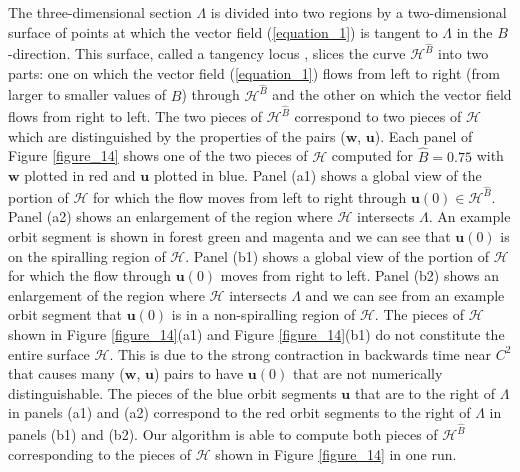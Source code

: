 \documentclass{ws-ijbc}
\begin{document}
The three-dimensional section $\Lambda$ is divided into two regions by a two-dimensional surface of points at which the vector field (\ref{equation_1}) is tangent to $\Lambda$ in the $B$-direction.  This surface, called a tangency locus \cite{tangency_locus_paper}, slices the curve $\mathscr{H}^{\widehat{B}}$ into two parts: one on which the vector field (\ref{equation_1}) flows from left to right (from larger to smaller values of $B$) through $\mathscr{H}^{\widehat{B}}$ and the other on which the vector field flows from right to left.  The two pieces of $\mathscr{H}^{\widehat{B}}$ correspond to two pieces of $\mathscr{H}$ which are distinguished by the properties of the pairs ($\mathbf{w}$, $\mathbf{u}$).  Each panel of Figure \ref{figure_14} shows one of the two pieces of $\mathscr{H}$ computed for $\widehat{B}=0.75$ with $\mathbf{w}$ plotted in red and $\mathbf{u}$ plotted in blue.  Panel (a1) shows a global view of the portion of $\mathscr{H}$ for which the flow moves from left to right through $\mathbf{u}(0) \in \mathscr{H}^{\widehat{B}}$.  Panel (a2) shows an enlargement of the region where $\mathscr{H}$ intersects $\Lambda$.  An example orbit segment is shown in forest green and magenta and we can see that $\mathbf{u}(0)$ is on the spiralling region of $\mathscr{H}$. Panel (b1) shows a global view of the portion of $\mathscr{H}$ for which the flow through $\mathbf{u}(0)$ moves from right to left.  Panel (b2) shows an enlargement of the region where $\mathscr{H}$ intersects $\Lambda$ and we can see from an example orbit segment that $\mathbf{u}(0)$ is in a non-spiralling region of $\mathscr{H}$.  The pieces of $\mathscr{H}$ shown in Figure \ref{figure_14}(a1) and Figure \ref{figure_14}(b1) do not constitute the entire surface $\mathscr{H}$.  This is due to the strong contraction in backwards time near $C^2$ that causes many ($\mathbf{w}$, $\mathbf{u}$) pairs to have $\mathbf{u}(0)$ that are not numerically distinguishable.  The pieces of the blue orbit segments $\mathbf{u}$ that are to the right of $\Lambda$ in panels (a1) and (a2) correspond to the red orbit segments to the right of $\Lambda$ in panels (b1) and (b2).  Our algorithm is able to compute both pieces of $\mathscr{H}^{\widehat{B}}$ corresponding to the pieces of $\mathscr{H}$ shown in Figure \ref{figure_14} in one run.
\end{document}
